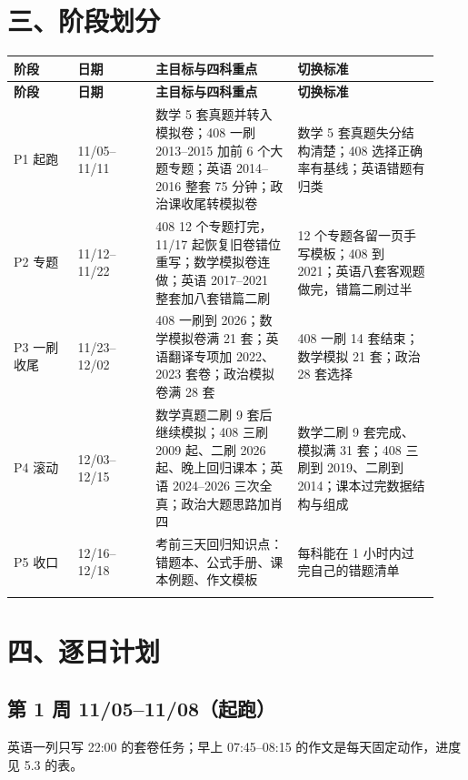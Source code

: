 \documentclass[UTF8,a4paper,11pt]{ctexart}
\begin{document}
\needspace{.34\textheight}\section{三、阶段划分}
{\small\renewcommand{\arraystretch}{1.38}\setlength{\tabcolsep}{3.5pt}
\begin{longtable}{P{0.14\linewidth}P{0.17\linewidth}P{0.31\linewidth}P{0.31\linewidth}}
\toprule
\bfseries 阶段 & \bfseries 日期 & \bfseries 主目标与四科重点 & \bfseries 切换标准 \\
\midrule
\endfirsthead
\toprule
\bfseries 阶段 & \bfseries 日期 & \bfseries 主目标与四科重点 & \bfseries 切换标准 \\
\midrule
\endhead
P1 起跑 & 11/05–11/11 & 数学 5 套真题并转入模拟卷；408 一刷 2013–2015 加前 6 个大题专题；英语 2014–2016 整套 75 分钟；政治课收尾转模拟卷 & 数学 5 套真题失分结构清楚；408 选择正确率有基线；英语错题有归类 \\
\addlinespace[.35em]
P2 专题 & 11/12–11/22 & 408 12 个专题打完，11/17 起恢复旧卷错位重写；数学模拟卷连做；英语 2017–2021 整套加八套错篇二刷 & 12 个专题各留一页手写模板；408 到 2021；英语八套客观题做完，错篇二刷过半 \\
\addlinespace[.35em]
P3 一刷收尾 & 11/23–12/02 & 408 一刷到 2026；数学模拟卷满 21 套；英语翻译专项加 2022、2023 套卷；政治模拟卷满 28 套 & 408 一刷 14 套结束；数学模拟 21 套；政治 28 套选择 \\
\addlinespace[.35em]
P4 滚动 & 12/03–12/15 & 数学真题二刷 9 套后继续模拟；408 三刷 2009 起、二刷 2026 起、晚上回归课本；英语 2024–2026 三次全真；政治大题思路加肖四 & 数学二刷 9 套完成、模拟满 31 套；408 三刷到 2019、二刷到 2014；课本过完数据结构与组成 \\
\addlinespace[.35em]
P5 收口 & 12/16–12/18 & 考前三天回归知识点：错题本、公式手册、课本例题、作文模板 & 每科能在 1 小时内过完自己的错题清单 \\
\addlinespace[.35em]
\bottomrule
\end{longtable}
}
\needspace{.34\textheight}\section{四、逐日计划}
\needspace{.34\textheight}\subsection{第 1 周 11/05–11/08（起跑）}
英语一列只写 22:00 的套卷任务；早上 07:45–08:15 的作文是每天固定动作，进度见 5.3 的表。
\end{document}
